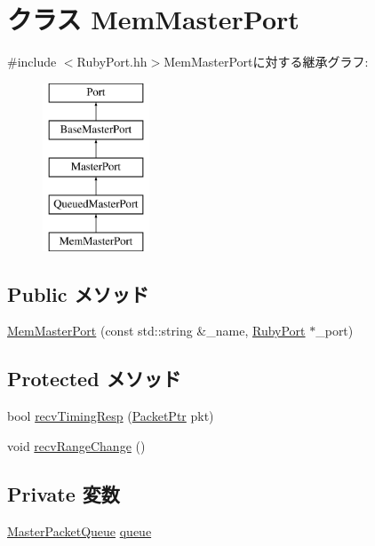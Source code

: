 \hypertarget{classRubyPort_1_1MemMasterPort}{
\section{クラス MemMasterPort}
\label{classRubyPort_1_1MemMasterPort}
}


{\ttfamily \#include $<$RubyPort.hh$>$}MemMasterPortに対する継承グラフ:\begin{figure}[H]
\begin{center}
\leavevmode
\includegraphics[height=5cm]{classRubyPort_1_1MemMasterPort}
\end{center}
\end{figure}
\subsection*{Public メソッド}
\begin{DoxyCompactItemize}
\item 
\hyperlink{classRubyPort_1_1MemMasterPort_a9a3e2dce04377a6628c5a4ae457d6fdc}{MemMasterPort} (const std::string \&\_\-name, \hyperlink{classRubyPort}{RubyPort} $\ast$\_\-port)
\end{DoxyCompactItemize}
\subsection*{Protected メソッド}
\begin{DoxyCompactItemize}
\item 
bool \hyperlink{classRubyPort_1_1MemMasterPort_a482dba5588f4bee43e498875a61e5e0b}{recvTimingResp} (\hyperlink{classPacket}{PacketPtr} pkt)
\item 
void \hyperlink{classRubyPort_1_1MemMasterPort_aecf310a01b533ae8700eccac2cf20480}{recvRangeChange} ()
\end{DoxyCompactItemize}
\subsection*{Private 変数}
\begin{DoxyCompactItemize}
\item 
\hyperlink{classMasterPacketQueue}{MasterPacketQueue} \hyperlink{classRubyPort_1_1MemMasterPort_aae3ed0c3ef8ff189915e74fe401279b5}{queue}
\end{DoxyCompactItemize}



